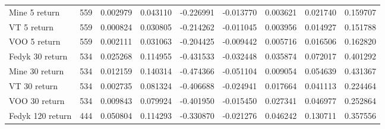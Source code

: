 \begin{appendices}
\begin{table}[ht]
\begin{adjustbox}{width=\textwidth}
\begin{tabular}{@{}l|llllllll@{}}
    Mine 5 return        & 559                                & 0.002979                          & 0.043110                         & -0.226991                        & -0.013770                         & 0.003621                          & 0.021740                          & 0.159707                         \\
    VT 5 return               & 559                               & 0.000824                           & 0.030805                         & -0.214262                        & -0.011045                         & 0.003956                          & 0.014927                          & 0.151788                         \\
    VOO 5 return              & 559                               & 0.002111                           & 0.031063                         & -0.204425                        & -0.009442                         & 0.005716                          & 0.016506                          & 0.162820                         \\
    Fedyk 30 return      & 534                                & 0.025268                          & 0.114955                         & -0.431533                        & -0.032448                         & 0.035874                          & 0.072017                          & 0.401292                         \\
    Mine 30 return       & 534                                & 0.012159                          & 0.140314                         & -0.474366                        & -0.051104                         & 0.009054                          & 0.054639                          & 0.431367                         \\
    VT 30 return              & 534                               & 0.002735                           & 0.081324                         & -0.406688                        & -0.024941                         & 0.017664                          & 0.041113                          & 0.224464                         \\
    VOO 30 return             & 534                               & 0.009843                           & 0.079924                         & -0.401950                        & -0.015450                         & 0.027341                          & 0.046977                          & 0.252864                         \\
    Fedyk 120 return     & 444                                & 0.050804                          & 0.114293                         & -0.330870                        & -0.021276                         & 0.046242                          & 0.130711                          & 0.357556                         \\

\end{tabular}
\end{adjustbox}
\end{table}
\end{appendices}
